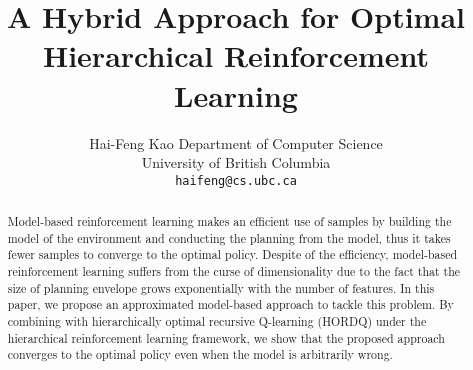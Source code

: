 \documentclass{article} %
\title{A Hybrid Approach for Optimal Hierarchical Reinforcement Learning}
\author{
Hai-Feng Kao
Department of Computer Science\\
University of British Columbia\\
\texttt{haifeng@cs.ubc.ca}
}
\begin{document}
\maketitle

\begin{abstract}
Model-based reinforcement learning makes an efficient use of samples by 
building the model of the environment and conducting the planning from the model,
thus it takes fewer samples to converge to the optimal policy.
Despite of the efficiency, model-based reinforcement learning 
suffers from the curse of dimensionality due to the fact that
the size of planning envelope grows exponentially with the number 
of features. In this paper, we propose an approximated model-based
approach to tackle this problem. By combining with 
hierarchically optimal recursive Q-learning (HORDQ) under 
the hierarchical reinforcement learning framework, we show that
the proposed approach converges to the optimal policy even when
the model is arbitrarily wrong.
\end{abstract}
\end{document}
